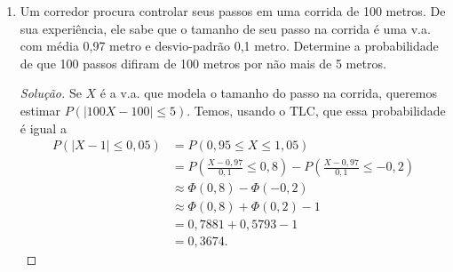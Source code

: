 \documentclass[../Notas.tex]{subfiles}
\begin{document}
\begin{enumerate}
\begin{proof}[Solução]
\begin{enumerate}[a)]
\begin{align*}
                                     &= 2\Phi(2) - 1 \\
                                     &= 2\cdot 0,9772 - 1 \\
                                     &= 0,9544.
            \end{align*}
            Portanto, a probabilidade procurada é aproximadamente $0,9544$.
        \end{enumerate}
    \end{proof}
    \item Um corredor procura controlar seus passos em uma corrida de 100 metros. De sua experiência, ele sabe que o tamanho de seu passo na corrida é uma v.a. com média 0,97 metro e desvio-padrão 0,1 metro. Determine a probabilidade de que 100 passos difiram de 100 metros por não mais de 5 metros.
    \begin{proof}[Solução]
        Se $X$ é a v.a. que modela o tamanho do passo na corrida, queremos estimar $P(|100X - 100| \leq 5)$.
        Temos, usando o TLC, que essa probabilidade é igual a
        \begin{align*}
            P(|X-1|\leq 0,05) &= P(0,95 \leq X \leq 1,05) \\
                              &= P\left( \frac{X-0,97}{0,1} \leq 0,8 \right) - P\left( \frac{X-0,97}{0,1} \leq -0,2 \right) \\
                              &\approx \Phi(0,8) - \Phi(-0,2) \\
                              &\approx \Phi(0,8) + \Phi(0,2) - 1 \\
                              &= 0,7881 + 0,5793 - 1 \\
                              &= 0,3674.
        \end{align*}
    \end{proof}
\end{enumerate}
\end{document}
